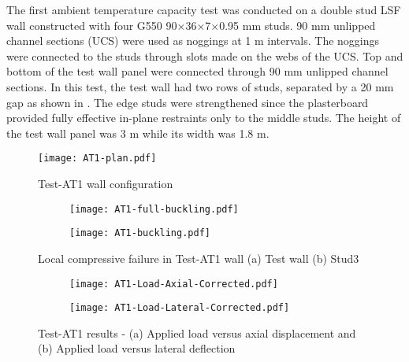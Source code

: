 The first ambient temperature capacity test was conducted on a double stud LSF wall constructed with four G550 90$\times$36$\times$7$\times$0.95 mm studs. 90 mm unlipped channel sections (UCS) were used as noggings at 1 m intervals. The noggings were connected to the studs through slots made on the webs of the UCS. Top and bottom of the test wall panel were connected through 90 mm unlipped channel sections. In this test, the test wall had two rows of studs, separated by a 20 mm gap as shown in . The edge studs were strengthened since the plasterboard provided fully effective in-plane restraints only to the middle studs. The height of the test wall panel was 3 m while its width was 1.8 m.
\begin{figure}[!htbp]
	\centering
			\texttt{[image: AT1-plan.pdf]}\\
		\caption{Test-AT1 wall configuration}
		\label{fig:AT1-plan}
\end{figure} 
\begin{figure}[!htbp]
	\centering
	\begin{subfigure}[b]{0.4\textwidth}
		\centering
		\texttt{[image: AT1-full-buckling.pdf]}
		\caption{}
		\label{subfig:AT1-full-buckling}
	\end{subfigure}
	\begin{subfigure}[b]{0.4\textwidth}
		\centering
		\texttt{[image: AT1-buckling.pdf]}
		\caption{}
		\label{subfig:AT1-buckling}
	\end{subfigure}
	   \caption{Local compressive failure in Test-AT1 wall (a) Test wall (b) Stud3}
	   \label{fig:AT1-failure}
\end{figure}
\begin{figure}[!htbp]
	\centering
	\begin{subfigure}[b]{0.45\textwidth}
		\centering
		\texttt{[image: AT1-Load-Axial-Corrected.pdf]}
		\caption{}
		\label{subfig:AT1-Load-Axial-Corrected}
	\end{subfigure}
	\begin{subfigure}[b]{0.45\textwidth}
		\centering
		\texttt{[image: AT1-Load-Lateral-Corrected.pdf]}
		\caption{}
		\label{subfig:AT1-Load-Lateral-Corrected}
	\end{subfigure}
	   \caption{Test-AT1 results - (a) Applied load versus axial displacement and (b) Applied load versus lateral deflection}
	   \label{fig:AT1-results}
\end{figure}

